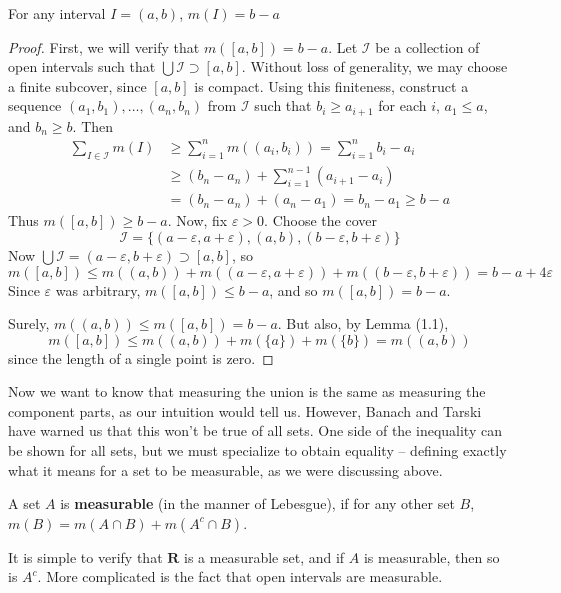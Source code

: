 \begin{lemma}
    For any interval $I = (a,b)$, $m(I) = b - a$
\end{lemma}
\begin{proof}
    First, we will verify that $m([a,b]) = b - a$. Let $\mathcal{I}$ be a collection of open intervals such that $\bigcup \mathcal{I} \supset [a,b]$. Without loss of generality, we may choose a finite subcover, since $[a,b]$ is compact. Using this finiteness, construct a sequence $(a_1, b_1), \dots, (a_n, b_n)$ from $\mathcal{I}$ such that $b_i \geq a_{i+1}$ for each $i$, $a_1 \leq a$, and $b_n \geq b$. Then
    \begin{align*}
        \sum_{I \in \mathcal{I}} m(I) &\geq \sum_{i = 1}^n m((a_i, b_i)) = \sum_{i = 1}^n b_i - a_i\\
        &\geq (b_n - a_n) + \sum_{i = 1}^{n-1} (a_{i+1} - a_i)\\
        &= (b_n - a_n) + (a_n - a_1) = b_n - a_1 \geq b - a
    \end{align*}
    Thus $m([a,b]) \geq b - a$. Now, fix $\varepsilon > 0$. Choose the cover
    \[ \mathcal{I} = \{ (a-\varepsilon,a+\varepsilon), (a,b), (b-\varepsilon, b+\varepsilon) \} \]
    Now $\bigcup \mathcal{I} = (a-\varepsilon, b+\varepsilon) \supset [a,b]$, so
    \[ m([a,b]) \leq m((a,b)) + m((a-\varepsilon, a+\varepsilon)) + m((b-\varepsilon,b+\varepsilon)) = b - a + 4\varepsilon \]
    Since $\varepsilon$ was arbitrary, $m([a,b]) \leq b - a$, and so $m([a,b]) = b - a$.

    Surely, $m((a,b)) \leq m([a,b]) = b - a$. But also, by Lemma (1.1),
    \[ m([a,b]) \leq m((a,b)) + m(\{a\}) + m(\{b\}) = m((a,b)) \]
    since the length of a single point is zero.
\end{proof}

Now we want to know that measuring the union is the same as measuring the component parts, as our intuition would tell us. However, Banach and Tarski have warned us that this won't be true of all sets. One side of the inequality can be shown for all sets, but we must specialize to obtain equality -- defining exactly what it means for a set to be measurable, as we were discussing above.

\begin{definition}
    A set $A$ is {\bf measurable} (in the manner of Lebesgue), if for any other set $B$, $m(B) = m(A \cap B) + m(A^c \cap B)$.
\end{definition}

It is simple to verify that $\mathbf{R}$ is a measurable set, and if $A$ is measurable, then so is $A^c$. More complicated is the fact that open intervals are measurable.

